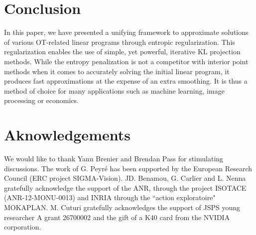 

\section*{Conclusion}

In this paper, we have presented a unifying framework to approximate solutions of various OT-related linear programs through entropic regularization. This regularization enables the use of simple, yet powerful, iterative KL projection methods. While the entropy penalization is not a competitor with interior point methods when it comes to accurately solving the initial linear program, it produces fast approximations at the expense of an extra smoothing. It is thus a method of choice for many applications such as machine learning, image processing or economics. 


\section*{Aknowledgements}

We would like to thank Yann Brenier and Brendan Pass for stimulating discussions.
%  
The work of G. Peyr\'e has been supported by the European Research Council (ERC project SIGMA-Vision).
% 
JD. Benamou, G. Carlier and L. Nenna gratefully acknowledge the support of the ANR, through the project ISOTACE (ANR-12-MONU-0013) and INRIA through the ``action exploratoire" MOKAPLAN.
%
M. Cuturi gratefully acknowledges the support of JSPS young researcher A grant 26700002 and the gift of a K40 card from the NVIDIA corporation.